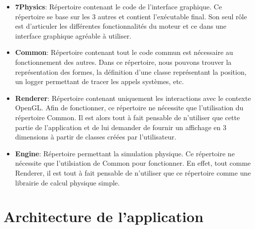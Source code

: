 \documentclass[11pt]{report}
\begin{document}
\begin{itemize}
  \item \textbf{7Physics}: Répertoire contenant le code de l'interface graphique. Ce répertoire se base sur les 3 autres
        et contient l'exécutable final. Son seul rôle est d'articuler les différentes fonctionnalités du moteur et ce
        dans une interface graphique agréable à utiliser.\newline
  \item\textbf{Common}: Répertoire contenant tout le code commun est nécessaire au fonctionnement des autres. Dans ce
        répertoire, nous pouvons trouver la représentation des formes, la définition d'une classe représentant la position,
        un logger permettant de tracer les appels systèmes, etc.\newline
  \item \textbf{Renderer}: Répertoire contenant uniquement les interactions avec le contexte OpenGL. Afin de fonctionner,
        ce répertoire ne nécessite que l'utilisation du répertoire Common. Il est alors tout à fait pensable de n'utiliser
        que cette partie de l'application et de lui demander de fournir un affichage en 3 dimensions à partir de classes
        créées par l'utilisateur.\newline
  \item \textbf{Engine}: Répertoire permettant la simulation physique. Ce répertoire ne nécessite que l'utilsiation
        de Common pour fonctionner. En effet, tout comme Renderer, il est tout à fait pensable de n'utiliser que ce répertoire
        comme une librairie de calcul physique simple.\newline
\end{itemize}

\chapter{Architecture de l'application}
\end{document}

